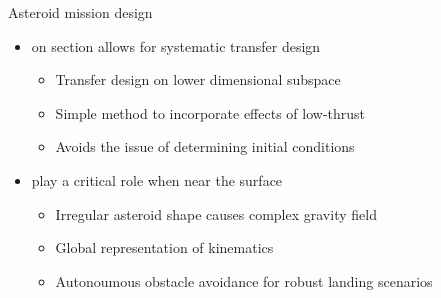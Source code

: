 \begin{frame}[t]{Asteroid mission design} %
  \begin{itemize}
      \item {} on \Poincare section allows for systematic transfer design
        \begin{itemize}
            \item Transfer design on lower dimensional subspace
            \item Simple method to incorporate effects of low-thrust 
            \item Avoids the issue of determining initial conditions
        \end{itemize}
        \pause
       \item {} play a critical role when near the surface
       \begin{itemize}
            \item Irregular asteroid shape causes complex gravity field
            \item Global representation of kinematics 
            \item Autonoumous obstacle avoidance for robust landing scenarios 
        \end{itemize}
  \end{itemize}

\end{frame} %

